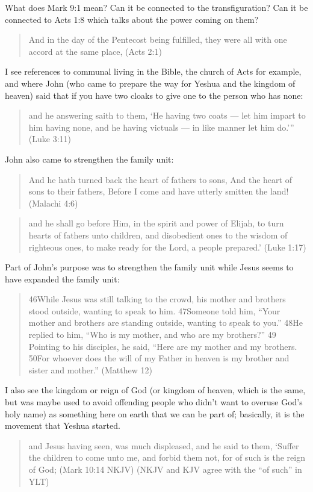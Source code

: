 \documentclass[11pt]{article}
\begin{document}
What does Mark 9:1 mean? Can it be connected to the transfiguration? Can it be connected to Acts 1:8 which talks about the power coming on them? 
\begin{quote}
And in the day of the Pentecost being fulfilled, they were all with one accord at the same place, (Acts 2:1)
\end{quote}
I see references to communal living in the Bible, the church
of Acts for example, and where John (who came to prepare the way for
Yeshua and the kingdom of heaven) said that if you have two cloaks to
give one to the person who has none:
\begin{quote}
and he answering saith to them, `He having two coats — let him impart to him having none, and he having victuals — in like manner let him do.’” (Luke 3:11)
\end{quote}
John also came to strengthen the family unit:
\begin{quote}
And he hath turned back the heart of fathers to sons, And the heart of sons to their fathers, Before I come and have utterly smitten the land! (Malachi 4:6)
\end{quote}
\begin{quote}
and he shall go before Him, in the spirit and power of Elijah, to turn hearts of fathers unto children, and disobedient ones to the wisdom of righteous ones, to make ready for the Lord, a people prepared.’ (Luke 1:17)
\end{quote}
Part of John’s purpose was to strengthen the family unit while Jesus seems to have expanded the family unit:
\begin{quote}
46While Jesus was still talking to the crowd, his mother and brothers stood outside, wanting to speak to him. 47Someone told him, “Your mother and brothers are standing outside, wanting to speak to you.” 48He replied to him, “Who is my mother, and who are my brothers?” 49 Pointing to his disciples, he said, “Here are my mother and my brothers. 50For whoever does the will of my Father in heaven is my brother and sister and mother.” (Matthew 12)
\end{quote}
I also see the kingdom or reign of God (or kingdom of heaven, which is the
same, but was maybe used to avoid offending people who didn’t want to overuse God’s holy name) as something here on earth that we can be part of; basically, it is the movement that Yeshua started.
\begin{quote}
and Jesus having seen, was much displeased, and he said to them, ‘Suffer the children to come unto me, and forbid them not, for of such is the reign of God; (Mark 10:14 NKJV) (NKJV and KJV agree
with the “of such” in YLT)
\end{quote}
\end{document}
